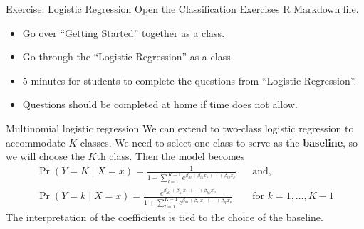 \documentclass[
  ignorenonframetext,
  aspectratio=169,
]{beamer}
\begin{document}
\begin{frame}{Exercise: Logistic Regression}
\protect\hypertarget{exercise-logistic-regression}{}
Open the Classification Exercises R Markdown file.

\begin{itemize}
\item
  Go over ``Getting Started'' together as a class.
\item
  Go through the ``Logistic Regression'' as a class.
\item
  5 minutes for students to complete the questions from ``Logistic
  Regression''.
\item
  Questions should be completed at home if time does not allow.
\end{itemize}
\end{frame}

\begin{frame}{Multinomial logistic regression}
\protect\hypertarget{multinomial-logistic-regression}{}
We can extend to two-class logistic regression to accommodate \(K\)
classes. We need to select one class to serve as the \textbf{baseline},
so we will choose the \(K\)th class. Then the model becomes \[
\begin{aligned}
\operatorname{Pr}(Y=K \mid X=x)=\frac{1}{1+\sum_{l=1}^{K-1} e^{\beta_{l 0}+\beta_{l 1} x_{1}+\cdots+\beta_{l p} x_{p}}}
&& \text{and,} 
\\
\operatorname{Pr}(Y=k \mid X=x)=\frac{e^{\beta_{k 0}+\beta_{k 1} x_{1}+\cdots+\beta_{k p} x_{p}}}{1+\sum_{l=1}^{K-1} e^{\beta_{l 0}+\beta_{l 1} x_{1}+\cdots+\beta_{l p} x_{p}}} 
&& \text{for } k = 1, \dots, K-1
\end{aligned}
\] The interpretation of the coefficients is tied to the choice of the
baseline.
\end{frame}
\end{document}
